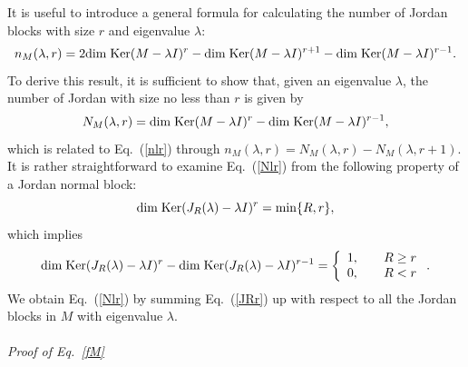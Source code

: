 \documentclass{tADP2e}
\theoremstyle{plain}
\theoremstyle{plain}
\theoremstyle{definition}
\begin{document}
\begin{appendices}
It is useful to introduce a general formula for calculating the number of Jordan blocks with size $r$ and eigenvalue $\lambda$: %
\begin{equation}
n_M(\lambda,r)=2{\rm dim\;Ker}(M-\lambda I)^r-{\rm dim\;Ker}(M-\lambda I)^{r+1}-{\rm dim\;Ker}(M-\lambda I)^{r-1}.
\label{nlr}
\end{equation}
To derive this result, it is sufficient to show that, given an eigenvalue $\lambda$, the number of Jordan
with size no less than $r$ is given by
\begin{equation}
N_M(\lambda,r)={\rm dim\;Ker}(M-\lambda I)^r-{\rm dim\;Ker}(M-\lambda I)^{r-1},
\label{Nlr}
\end{equation}
which is related to Eq.~(\ref{nlr}) through $n_M(\lambda,r)=N_M(\lambda,r)-N_M(\lambda,r+1)$. It is rather straightforward to examine Eq.~(\ref{Nlr}) from the following property of a Jordan normal block:
\begin{equation}
{\rm dim\;Ker}(J_R(\lambda)-\lambda I)^r=\min\{R,r\},
\end{equation} 
which implies
\begin{equation}
{\rm dim\;Ker}(J_R(\lambda)-\lambda I)^r-{\rm dim\;Ker}(J_R(\lambda)-\lambda I)^{r-1}=\left\{\begin{array}{ll} 1,\;\; & \;\;R\ge r \\ 0,\;\; & \;\;R<r \end{array}\right..
\label{JRr}
\end{equation}
We obtain Eq.~(\ref{Nlr}) by summing Eq.~(\ref{JRr}) up with respect to all the Jordan blocks in $M$ with eigenvalue $\lambda$.
\\
\\
{\it Proof of Eq.~\eqref{fM}}


\end{appendices}
\end{document}
